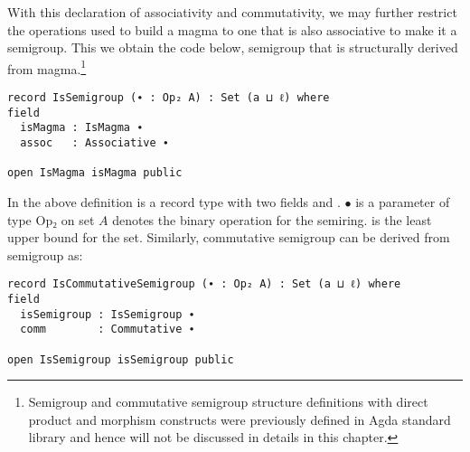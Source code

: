 With this declaration of associativity and commutativity, we may further
restrict the operations used to build a magma to one that is also associative to
make it a semigroup. This we obtain the code below, semigroup that is
structurally derived from magma.\footnote{Semigroup and commutative semigroup
structure definitions with direct product and morphism constructs were
previously defined in Agda standard library and hence will not be discussed in
details in this chapter.}

\begin{verbatim}
record IsSemigroup (∙ : Op₂ A) : Set (a ⊔ ℓ) where
field
  isMagma : IsMagma ∙
  assoc   : Associative ∙

open IsMagma isMagma public
\end{verbatim}
In the above definition  is a record type with two fields
 and . $∙$ is a parameter of type Op₂ on set $A$
denotes the binary operation for the semiring.  is the least upper
bound for the set. Similarly, commutative semigroup can be derived from
semigroup as: 
\begin{verbatim}
record IsCommutativeSemigroup (∙ : Op₂ A) : Set (a ⊔ ℓ) where
field
  isSemigroup : IsSemigroup ∙
  comm        : Commutative ∙

open IsSemigroup isSemigroup public
\end{verbatim}


